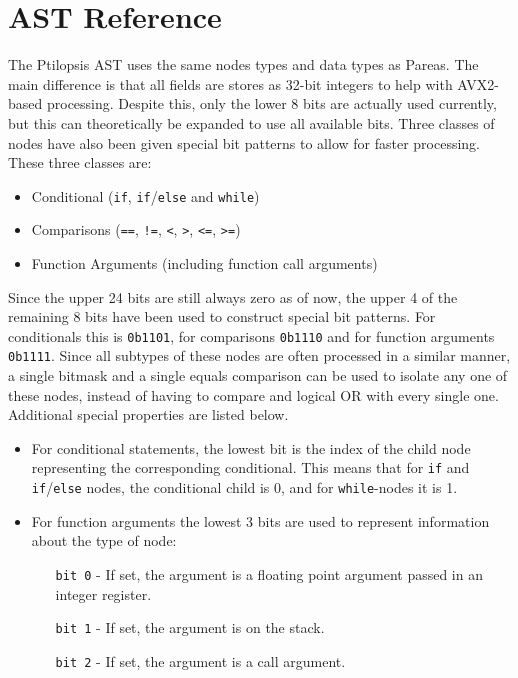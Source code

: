 \documentclass[11pt,dvipsnames]{article}
\newcommand{\icpp}[1]{\texttt{#1}}
\newcommand{\mono}[1]{\texttt{#1}}
\begin{document}
\section{AST Reference} \label{ast}
The Ptilopsis AST uses the same nodes types and data types as Pareas. The main difference is that all fields are stores as 32-bit integers to help with AVX2-based processing. Despite this, only the lower 8 bits are actually used currently, but this can theoretically be expanded to use all available bits. Three classes of nodes have also been given special bit patterns to allow for faster processing. These three classes are:
\begin{itemize}
    \item Conditional (\icpp{if}, \icpp{if}/\icpp{else} and \icpp{while})
    \item Comparisons (\mono{==}, \mono{!=}, \mono{<}, \mono{>}, \mono{<=}, \mono{>=})
    \item Function Arguments (including function call arguments)
\end{itemize}

Since the upper 24 bits are still always zero as of now, the upper 4 of the remaining 8 bits have been used to construct special bit patterns. For conditionals this is \mono{0b1101}, for comparisons \mono{0b1110} and for function arguments \mono{0b1111}. Since all subtypes of these nodes are often processed in a similar manner, a single bitmask and a single equals comparison can be used to isolate any one of these nodes, instead of having to compare and logical OR with every single one. Additional special properties are listed below.
\begin{itemize}
    \item For conditional statements, the lowest bit is the index of the child node representing the corresponding conditional. This means that for \icpp{if} and \icpp{if}/\icpp{else} nodes, the conditional child is 0, and for \icpp{while}-nodes it is 1.
    \item For function arguments the lowest 3 bits are used to represent information about the type of node:
    \begin{itemize}
        \item[\mono{bit 0}] - If set, the argument is a floating point argument passed in an integer register.
        \item[\mono{bit 1}] - If set, the argument is on the stack.
        \item[\mono{bit 2}] - If set, the argument is a call argument.
    \end{itemize}
\end{itemize}
\end{document}
